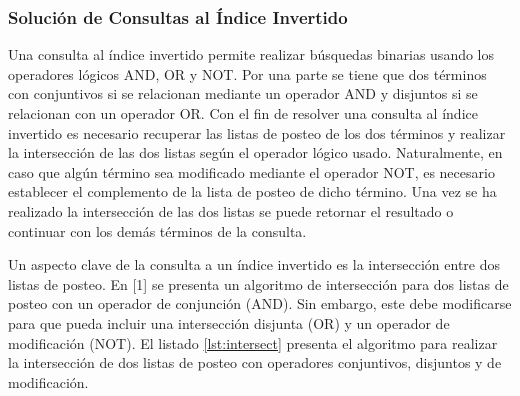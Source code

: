 \subsubsection{Solución de Consultas al Índice Invertido}
Una consulta al índice invertido permite realizar búsquedas binarias usando los operadores lógicos AND, OR y NOT. Por una parte se tiene que dos términos con conjuntivos si se relacionan mediante un operador AND y disjuntos si se relacionan con un operador OR. Con el fin de resolver una consulta al índice invertido es necesario recuperar las listas de posteo de los dos términos y realizar la intersección de las dos listas según el operador lógico usado. Naturalmente, en caso que algún término sea modificado mediante el operador NOT, es necesario establecer el complemento de la lista de posteo de dicho término. Una vez se ha realizado la intersección de las dos listas se puede retornar el resultado o continuar con los demás términos de la consulta.

Un aspecto clave de la consulta a un índice invertido es la intersección entre dos listas de posteo. En [1] se presenta un algoritmo de intersección para dos listas de posteo con un operador de conjunción (AND). Sin embargo, este debe modificarse para que pueda incluir una intersección disjunta (OR) y un operador de modificación (NOT). El listado \ref{lst:intersect} presenta el algoritmo para realizar la intersección de dos listas de posteo con operadores conjuntivos, disjuntos y de modificación.


